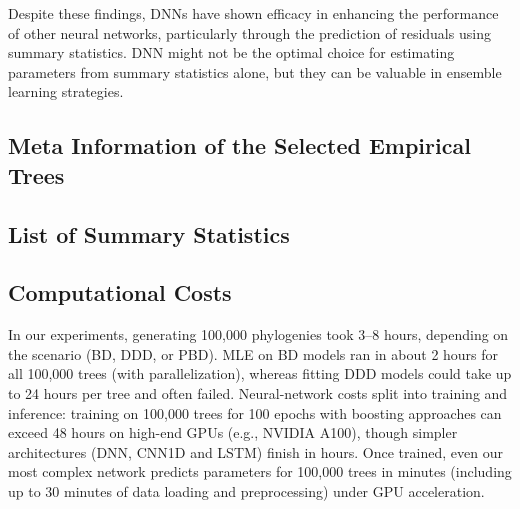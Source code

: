 {Despite these findings, DNNs have shown efficacy in enhancing the performance of other neural networks, particularly through the prediction of residuals using summary statistics. DNN might not be the optimal choice for estimating parameters from summary statistics alone, but they can be valuable in ensemble learning strategies.

\clearpage
\subsection{Meta Information of the Selected Empirical Trees}
\label{appendix::meta_info_empirical_trees}


\clearpage
\subsection{List of Summary Statistics}
\label{appendix::list_stats}


\clearpage
\subsection{Computational Costs}
\label{appendix::compute_cost}
In our experiments, generating 100,000 phylogenies took 3--8 hours, depending on the scenario (BD, DDD, or PBD). MLE on BD models ran in about 2 hours for all 100,000 trees (with parallelization), whereas fitting DDD models could take up to 24 hours per tree and often failed. Neural-network costs split into training and inference: training on 100,000 trees for 100 epochs with boosting approaches can exceed 48 hours on high-end GPUs (e.g., NVIDIA A100), though simpler architectures (DNN, CNN1D and LSTM) finish in  hours. Once trained, even our most complex network predicts parameters for 100,000 trees in  minutes (including up to 30 minutes of data loading and preprocessing) under GPU acceleration.
}